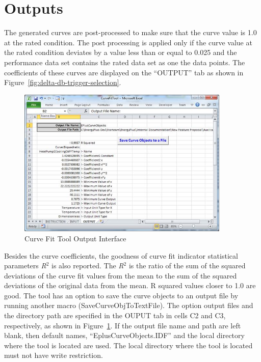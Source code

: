 \section{Outputs}\label{outputs}

The generated curves are post-processed to make sure that the curve value is 1.0 at the rated condition. The post processing is applied only if the curve value at the rated condition deviates by a value less than or equal to 0.025 and the performance data set contains the rated data set as one the data points. The coefficients of these curves are displayed on the ``OUTPUT'' tab as shown in Figure~\ref{fig:delta-db-trigger-selection}.

\begin{figure}[hbtp] %
\centering
\includegraphics[width=0.9\textwidth, height=0.9\textheight, keepaspectratio=true]{media/image036.jpg}
\caption{Curve Fit Tool Output Interface \protect \label{fig:curve-fit-tool-output-interface}}
\end{figure}

Besides the curve coefficients, the goodness of curve fit indicator statistical parameters \emph{R\(^{2}\)} is also reported. The \emph{R\(^{2}\)} is the ratio of the sum of the squared deviations of the curve fit values from the mean to the sum of the squared deviations of the original data from the mean. R squared values closer to 1.0 are good. The tool has an option to save the curve objects to an output file by running another macro (SaveCurveObjToTextFile). The option output files and the directory path are specified in the OUPUT tab in cells C2 and C3, respectively, as shown in Figure~\ref{fig:curve-fit-tool-output-interface}. If the output file name and path are left blank, then default names, ``EplusCurveObjects.IDF'' and the local directory where the tool is located are used. The local directory where the tool is located must not have write restriction.

